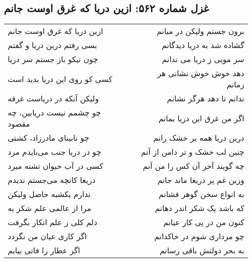 \begin{center}
\section*{غزل شماره ۵۶۲: ازین دریا که غرق اوست جانم}
\label{sec:562}
\begin{longtable}{l p{0.5cm} r}
ازین دریا که غرق اوست جانم
&&
برون جستم ولیکن در میانم
\\
بسی رفتم درین دریا و گفتم
&&
گشاده شد به دریا دیدگانم
\\
چون نیکو باز جستم سر دریا
&&
سر مویی ز دریا می ندانم
\\
کسی کو روی این دریا بدید است
&&
دهد خوش خوش نشانی هر زمانم
\\
ولیکن آنکه در دریاست غرقه
&&
ندانم تا دهد هرگز نشانم
\\
چو چشمم نیست دریابین، چه مقصود
&&
اگر من غرق این دریا بمانم
\\
چو نابینای مادرزاد، کشتی
&&
درین دریا همه بر خشک رانم
\\
چو در دریا جنب می‌بایدم مرد
&&
چنین لب خشک و تر دامن از آنم
\\
کسی در آب حیوان تشنه میرد
&&
چه گویند آخر آن کس را من آنم
\\
دریغا کانچه می‌جستم ندیدم
&&
وزین غم پر دریغا ماند جانم
\\
ندارم یکشبه حاصل ولیکن
&&
به انواع سخن گوهر فشانم
\\
مرا از عالمی علم شکر به
&&
که باشد یک شکر اندر دهانم
\\
دلم کلی ز علم انکار بگرفت
&&
کنون من در پی کار عیانم
\\
اگر کاری عیان من نگردد
&&
چو مرداری شوم در خاکدانم
\\
اگر عطار را فانی بیابم
&&
به بحر دولتش باقی رسانم
\\
\end{longtable}
\end{center}
